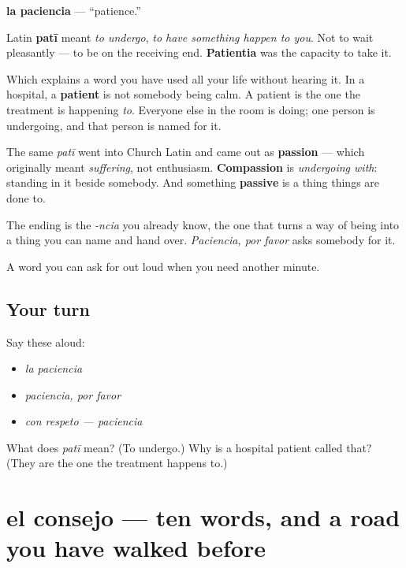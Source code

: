 \begin{cousinweb}
\textbf{la paciencia} — \textquotedblleft{}patience.\textquotedblright{}

Latin \textbf{patī} meant \emph{to undergo}, \emph{to have something happen to you}. Not to wait pleasantly — to be on the receiving end. \textbf{Patientia} was the capacity to take it.

Which explains a word you have used all your life without hearing it. In a hospital, a \textbf{patient} is not somebody being calm. A patient is the one the treatment is happening \emph{to}. Everyone else in the room is doing; one person is undergoing, and that person is named for it.

The same \emph{patī} went into Church Latin and came out as \textbf{passion} — which originally meant \emph{suffering}, not enthusiasm. \textbf{Compassion} is \emph{undergoing with}: standing in it beside somebody. And something \textbf{passive} is a thing things are done to.

The ending is the \emph{-ncia} you already know, the one that turns a way of being into a thing you can name and hand over. \emph{Paciencia, por favor} asks somebody for it.
\end{cousinweb}

\begin{grammarlens}[title={What you've built}]
A word you can ask for out loud when you need another minute.
\end{grammarlens}

\subsection*{Your turn}
Say these aloud:

\begin{itemize}
\raggedright
  \item \emph{la paciencia}
  \item \emph{paciencia, por favor}
  \item \emph{con respeto — paciencia}
\end{itemize}

\begin{tcolorbox}[breakable,colback=teal!4,colframe=teal!35!black,title={Before you move on}]
What does \emph{patī} mean? (To undergo.) Why is a hospital patient called that? (They are the one the treatment happens to.)
\end{tcolorbox}
\section[el consejo]{el consejo — ten words, and a road you have walked before}

